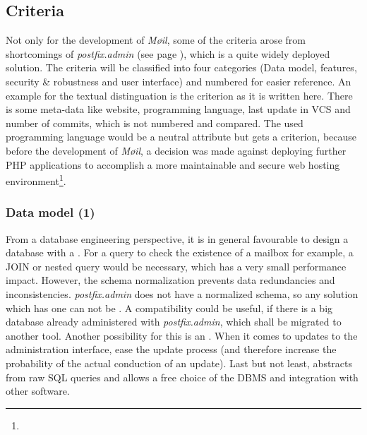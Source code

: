 \documentclass[12pt,a4paper]{scrartcl}
\begin{document}
		\subsection{Criteria}
		\label{sec:evaluation:criteria}
			Not only for the development of \emph{Møil}, some of the criteria
			arose from shortcomings of \emph{postfix.admin} (see page
			\pageref{sec:contestants:postfix.admin}), which is a quite widely
			deployed solution. The criteria will be classified into four
			categories (Data model, features, security \& robustness and user
			interface) and numbered for easier reference. An example for the
			textual distinguation is the criterion  as it is written here. There is some meta-data like
			website, programming language, last update in VCS and number of
			commits, which is not numbered and compared. The used programming
			language would be a neutral attribute but gets a criterion, because
			before the development of \emph{Møil}, a decision was made against
			deploying further PHP applications to accomplish a more
			maintainable and secure web hosting
			environment\footnote{\urlPHPBashing}.

			\subsubsection{Data model (1)}
				From a database engineering perspective, it is in general
				favourable to design a data\-base with a  \cite{dbnorm}. For a query to
				check the existence of a mailbox for example, a JOIN or nested
				query would be necessary, which has a very small performance
				impact. However, the schema normalization prevents data
				redundancies and inconsistencies. \emph{postfix.admin} does not
				have a normalized schema, so any solution which has one can not
				be . A
				compatibility could be useful, if there is a big database
				already administered with \emph{postfix.admin}, which shall be
				migrated to another tool. Another possibility for this is an
				. When it comes
				to updates to the administration interface,  ease the update process
				(and therefore increase the probability of the actual
				conduction of an update). Last but not least,  abstracts from raw \ac{SQL} queries
				and allows a free choice of the \ac{DBMS} and integration with
				other software.
\end{document}
